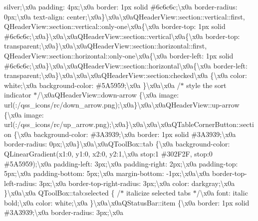 \begin{DoxyCompactItemize}
silver;\textbackslash{}x0a padding\+: 4px;\textbackslash{}x0a border\+: 1px solid \#6c6c6c;\textbackslash{}x0a border-\/radius\+: 0px;\textbackslash{}x0a text-\/align\+: center;\textbackslash{}x0a\}\textbackslash{}x0a\textbackslash{}x0a\+Q\+Header\+View\+::section\+::vertical\+::first, Q\+Header\+View\+::section\+::vertical\+::only-\/one\textbackslash{}x0a\{\textbackslash{}x0a border-\/top\+: 1px solid \#6c6c6c;\textbackslash{}x0a\}\textbackslash{}x0a\textbackslash{}x0a\+Q\+Header\+View\+::section\+::vertical\textbackslash{}x0a\{\textbackslash{}x0a border-\/top\+: transparent;\textbackslash{}x0a\}\textbackslash{}x0a\textbackslash{}x0a\+Q\+Header\+View\+::section\+::horizontal\+::first, Q\+Header\+View\+::section\+::horizontal\+::only-\/one\textbackslash{}x0a\{\textbackslash{}x0a border-\/left\+: 1px solid \#6c6c6c;\textbackslash{}x0a\}\textbackslash{}x0a\textbackslash{}x0a\+Q\+Header\+View\+::section\+::horizontal\textbackslash{}x0a\{\textbackslash{}x0a border-\/left\+: transparent;\textbackslash{}x0a\}\textbackslash{}x0a\textbackslash{}x0a\textbackslash{}x0a\+Q\+Header\+View\+::section\+:checked\textbackslash{}x0a \{\textbackslash{}x0a color\+: white;\textbackslash{}x0a background-\/color\+: \#5\+A5959;\textbackslash{}x0a \}\textbackslash{}x0a\textbackslash{}x0a /$\ast$ style the sort indicator $\ast$/\textbackslash{}x0a\+Q\+Header\+View\+::down-\/arrow \{\textbackslash{}x0a image\+: url(\+:/qss\+\_\+icons/rc/down\+\_\+arrow.\+png);\textbackslash{}x0a\}\textbackslash{}x0a\textbackslash{}x0a\+Q\+Header\+View\+::up-\/arrow \{\textbackslash{}x0a image\+: url(\+:/qss\+\_\+icons/rc/up\+\_\+arrow.\+png);\textbackslash{}x0a\}\textbackslash{}x0a\textbackslash{}x0a\textbackslash{}x0a\+Q\+Table\+Corner\+Button\+::section \{\textbackslash{}x0a background-\/color\+: \#3\+A3939;\textbackslash{}x0a border\+: 1px solid \#3\+A3939;\textbackslash{}x0a border-\/radius\+: 0px;\textbackslash{}x0a\}\textbackslash{}x0a\textbackslash{}x0a\+Q\+Tool\+Box\+::tab \{\textbackslash{}x0a background-\/color\+: Q\+Linear\+Gradient(x1\+:0, y1\+:0, x2\+:0, y2\+:1,\textbackslash{}x0a stop\+:1 \#302\+F2\+F, stop\+:0 \#5\+A5959);\textbackslash{}x0a padding-\/left\+: 3px;\textbackslash{}x0a padding-\/right\+: 2px;\textbackslash{}x0a padding-\/top\+: 5px;\textbackslash{}x0a padding-\/bottom\+: 5px;\textbackslash{}x0a margin-\/bottom\+: -\/1px;\textbackslash{}x0a\textbackslash{}x0a border-\/top-\/left-\/radius\+: 3px;\textbackslash{}x0a border-\/top-\/right-\/radius\+: 3px;\textbackslash{}x0a color\+: darkgray;\textbackslash{}x0a \}\textbackslash{}x0a\textbackslash{}x0a Q\+Tool\+Box\+::tab\+:selected \{ /$\ast$ italicize selected tabs $\ast$/\textbackslash{}x0a font\+: italic bold;\textbackslash{}x0a color\+: white;\textbackslash{}x0a \}\textbackslash{}x0a\textbackslash{}x0a\+Q\+Status\+Bar\+::item \{\textbackslash{}x0a border\+: 1px solid \#3\+A3939;\textbackslash{}x0a border-\/radius\+: 3px;\textbackslash{}x0a 
\end{DoxyCompactItemize}
